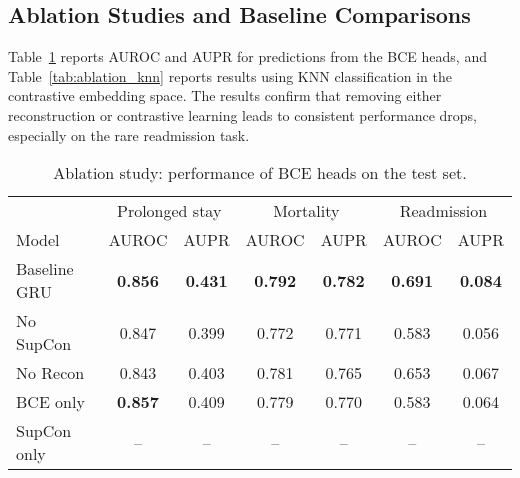 \documentclass{article}
\theoremstyle{plain}
\theoremstyle{definition}
\theoremstyle{remark}
\begin{document}
\subsection{Ablation Studies and Baseline Comparisons}
\label{app:ablations}

Table~\ref{tab:ablation_bce} reports AUROC and AUPR for predictions from the BCE heads, 
and Table~\ref{tab:ablation_knn} reports results using KNN classification in the 
contrastive embedding space. The results confirm that removing either reconstruction 
or contrastive learning leads to consistent performance drops, especially on the rare readmission task.

\begin{table}[h]
    \centering
    \scriptsize
    \begin{tabular}{lcccccc}
        \toprule
        & \multicolumn{2}{c}{Prolonged stay} & \multicolumn{2}{c}{Mortality} & \multicolumn{2}{c}{Readmission} \\
        \cmidrule(lr){2-3}\cmidrule(lr){4-5}\cmidrule(lr){6-7}
        Model & AUROC & AUPR & AUROC & AUPR & AUROC & AUPR \\
        \midrule
        Baseline GRU & \textbf{0.856} & \textbf{0.431} & \textbf{0.792} & \textbf{0.782} & \textbf{0.691} & \textbf{0.084} \\
        No SupCon    & 0.847 & 0.399 & 0.772 & 0.771 & 0.583 & 0.056 \\
        No Recon     & 0.843 & 0.403 & 0.781 & 0.765 & 0.653 & 0.067 \\
        BCE only     & \textbf{0.857} & 0.409 & 0.779 & 0.770 & 0.583 & 0.064 \\
        SupCon only  & --    & --    & --    & --    & --    & --    \\
        \bottomrule
    \end{tabular}
    \caption{Ablation study: performance of BCE heads on the test set.}
    \label{tab:ablation_bce}
\end{table}
\end{document}
